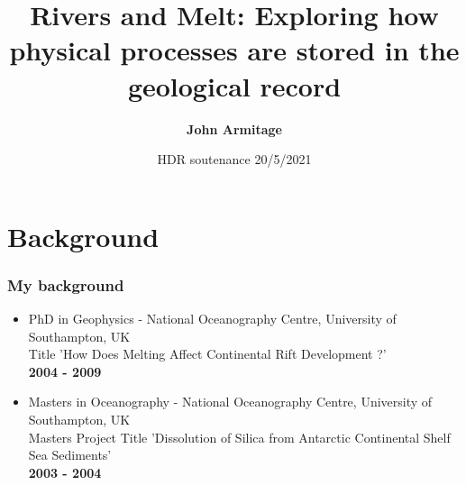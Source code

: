 \documentclass[aspectratio=169]{beamer}
\title[HDR soutenance]{Rivers and Melt: Exploring how physical processes are stored in the geological record}
\author[Armitage]{{\bf John Armitage}\inst{1}}
\institute[IFPEN]
{
  \inst{1}
  IFP Energies Nouvelles, France
}
\date[20 May]{HDR soutenance 20/5/2021}
\begin{document}
\newcommand{\SubItem}[1]{
    {\setlength\itemindent{15pt} \item[-] #1}
}

{
\begin{frame}
  \titlepage
\end{frame}
}

\section{Background}

\begin{frame}
    \frametitle{My background}
    \begin{itemize}
        \item{PhD in Geophysics - National Oceanography Centre, University of Southampton, UK \\
              Title 'How Does Melting Affect Continental Rift Development ?' \\
              \bf{2004 - 2009}}
        \item{Masters in Oceanography - National Oceanography Centre, University of Southampton, UK \\
              Masters Project Title 'Dissolution of Silica from Antarctic Continental Shelf Sea Sediments' \\
              \bf{2003 - 2004}}
    \end{itemize}
\end{frame}
\end{document}
